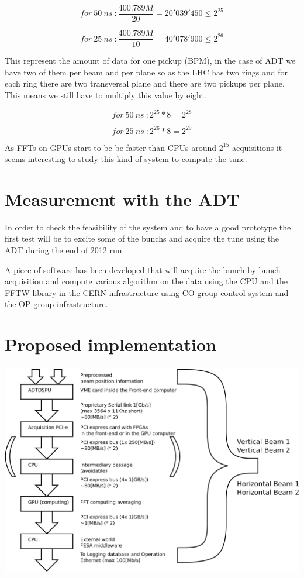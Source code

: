 \documentclass[a4paper]{article}
\begin{document}
$$for~50~ns~: \frac{400.789M}{20} = 20'039'450 \leq 2^{25}$$

$$for~25~ns~: \frac{400.789M}{10} = 40'078'900 \leq 2^{26}$$ 

This represent the amount of data for one pickup (\gls{BPM}), in the case of 
\gls{ADT} we have two of them per beam and per plane so as the \gls{LHC} has 
two rings and for each ring there are two transversal plane and there are 
two pickups per plane. This means we still have to multiply this value by 
eight.

$$for~50~ns~: 2^{25} * 8 = 2^{28}$$

$$for~25~ns~: 2^{26} * 8 = 2^{29}$$

As \glspl{FFT} on \glspl{GPU} start to be be faster than \glspl{CPU} around 
$2^{15}$ acquisitions it seems interesting to study this kind of system to 
compute the \gls{tune}.

\section{Measurement with the ADT}

In order to check the feasibility of the system and to have a good prototype
the first test will be to excite some of the \glspl{bunch} and acquire the
\gls{tune} using the \gls{ADT} during the end of 2012 run.

A piece of software has been developed that will acquire the bunch by bunch 
acquisition and compute various algorithm on the data using the \gls{CPU} 
and the \gls{FFTW} library in the \gls{CERN} infrastructure using \gls{CO} 
group control system and the \gls{OP} group infrastructure.

\section{Proposed implementation}

\includegraphics[scale=0.3]{dataflow.pdf}
\end{document}
